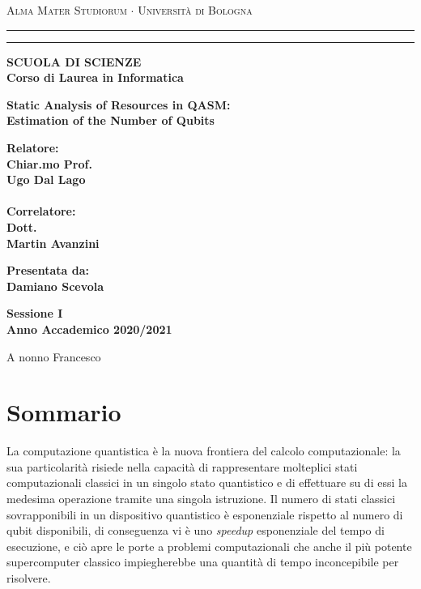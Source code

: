 \documentclass[12pt,a4paper]{report}
\theoremstyle{definition}
\theoremstyle{definition}
\theoremstyle{definition}
\newenvironment{dedication}
{%
\thispagestyle{empty}%
\vspace*{\stretch{1}}%
\itshape             %
\raggedleft          %
}
{\par %
\vspace{\stretch{3}} %
\clearpage           %
}
\begin{document}
\begin{titlepage}
\begin{center}
{{\Large{\textsc{Alma Mater Studiorum $\cdot$ Universit\`a di
Bologna}}}} \rule[0.1cm]{15.8cm}{0.1mm}
\rule[0.5cm]{15.8cm}{0.6mm}
{\small{\bf SCUOLA DI SCIENZE\\
Corso di Laurea in Informatica }}
\end{center}
\vspace{15mm}
\begin{center}
{\LARGE{\bf Static Analysis of Resources in QASM:}}\\
\vspace{3mm}
{\LARGE{\bf Estimation of the Number of Qubits}}\\
\end{center}
\vspace{40mm}
\par
\noindent
\begin{minipage}[t]{0.47\textwidth}
{\large{\bf Relatore:\\
Chiar.mo Prof.\\
Ugo Dal Lago\\
\\
Correlatore:\\
Dott.\\
Martin Avanzini\\
}}
\end{minipage}
\hfill
\begin{minipage}[t]{0.47\textwidth}\raggedleft
{\large{\bf Presentata da:\\
Damiano Scevola}}
\end{minipage}
\vspace{20mm}
\begin{center}
{\large{\bf Sessione I\\%
Anno Accademico 2020/2021}}%
\end{center}
\end{titlepage}

\begin{dedication}
A nonno Francesco
\end{dedication}

\chapter*{Sommario}
La computazione quantistica è la nuova frontiera del calcolo computazionale: la sua particolarità risiede nella capacità di rappresentare molteplici stati computazionali classici in un singolo stato quantistico e di effettuare su di essi la medesima operazione tramite una singola istruzione. Il numero di stati classici sovrapponibili in un dispositivo quantistico è esponenziale rispetto al numero di qubit disponibili, di conseguenza vi è uno \emph{speedup} esponenziale del tempo di esecuzione, e ciò apre le porte a problemi computazionali che anche il più potente supercomputer classico impiegherebbe una quantità di tempo inconcepibile per risolvere. 
\end{document}
